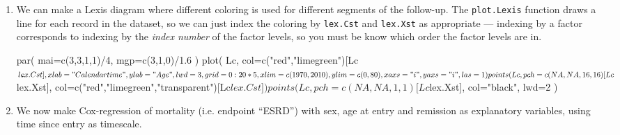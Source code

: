 \begin{enumerate}
\item We can make a Lexis diagram where different coloring is
  used for different segments of the follow-up. The
  \texttt{plot.Lexis} function draws a line for each record in the
  dataset, so we can just index the coloring by \texttt{lex.Cst} and
  \texttt{lex.Xst} as appropriate --- indexing by a factor corresponds
  to indexing by the \emph{index number} of the factor levels, so you
  must be know which order the factor levels are in.
\begin{Schunk}
\begin{Sinput}
 par( mai=c(3,3,1,1)/4, mgp=c(3,1,0)/1.6 )
 plot( Lc, col=c("red","limegreen")[Lc$lex.Cst],
       xlab="Calendar time", ylab="Age",
       lwd=3, grid=0:20*5, xlim=c(1970,2010), ylim=c(0,80), xaxs="i", yaxs="i", las=1 )
 points( Lc, pch=c(NA,NA,16,16)[Lc$lex.Xst],
             col=c("red","limegreen","transparent")[Lc$lex.Cst])
 points( Lc, pch=c(NA,NA,1,1)[Lc$lex.Xst],
             col="black", lwd=2 )
\end{Sinput}
\end{Schunk}


\item We now make Cox-regression of mortality (i.e. endpoint
       ``ESRD'') with sex, age at entry and remission as explanatory
       variables, using time since entry as timescale.


\end{enumerate}

